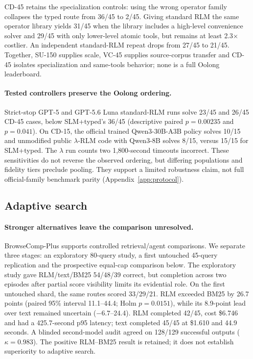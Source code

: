 \documentclass{article}
\begin{document}
CD-45 retains the specialization controls: using the wrong operator family collapses the typed route from 36/45 to 2/45. Giving standard RLM the same operator library yields 31/45 when the library includes a high-level convenience solver and 29/45 with only lower-level atomic tools, but remains at least 2.3$\times$ costlier. An independent standard-RLM repeat drops from 27/45 to 21/45. Together, SU-150 supplies scale, VC-45 supplies source-corpus transfer and CD-45 isolates specialization and same-tools behavior; none is a full Oolong leaderboard.

\paragraph{Tested controllers preserve the Oolong ordering.}
Strict-stop GPT-5 and GPT-5.6 Luna standard-RLM runs solve 23/45 and 26/45 CD-45 cases, below SLM+typed's 36/45 (descriptive paired $p{=}0.00235$ and $p{=}0.041$). On CD-15, the official trained Qwen3-30B-A3B policy solves 10/15 and unmodified public $\lambda$-RLM code with Qwen3-8B solves 8/15, versus 15/15 for SLM+typed. The $\lambda$ run counts two 1,800-second timeouts incorrect. These sensitivities do not reverse the observed ordering, but differing populations and fidelity tiers preclude pooling. They support a limited robustness claim, not full official-family benchmark parity (Appendix~\ref{app:protocol}).

\subsection{Adaptive search}

\paragraph{Stronger alternatives leave the comparison unresolved.}
BrowseComp-Plus supports controlled retrieval/agent comparisons. We separate three stages: an exploratory 80-query study, a first untouched 45-query replication and the prospective equal-cap comparison below. The exploratory study gave RLM/text/BM25 54/48/39 correct, but completion across two episodes after partial score visibility limits its evidential role. On the first untouched shard, the same routes scored 33/29/21. RLM exceeded BM25 by 26.7 points (paired 95\% interval 11.1--44.4; Holm $p{=}0.0151$), while its 8.9-point lead over text remained uncertain ($-6.7$--24.4). RLM completed 42/45, cost \$6.746 and had a 425.7-second p95 latency; text completed 45/45 at \$1.610 and 44.9 seconds. A blinded second-model audit agreed on 128/129 successful outputs ($\kappa{=}0.983$). The positive RLM--BM25 result is retained; it does not establish superiority to adaptive search.
\end{document}
